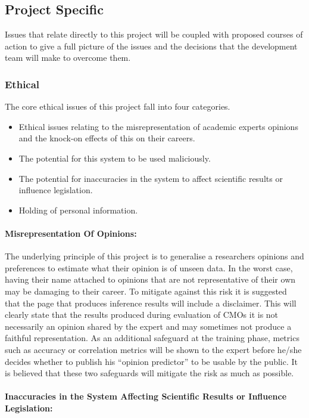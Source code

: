 \documentclass{ecmm427_assignment}
\begin{document}
\subsection{Project Specific}

Issues that relate directly to this project will
be coupled with proposed courses of action to give a full picture
of the issues and the decisions that the development team will make
to overcome them. 

\subsubsection{Ethical}

The core ethical issues of this project fall into four categories. 
\begin{itemize}
\item Ethical issues relating to the misrepresentation of academic experts
opinions and the knock-on effects of this on their careers.
\item The potential for this system to be used maliciously.
\item The potential for inaccuracies in the system to affect scientific
results or influence legislation. 
\item Holding of personal information.
\end{itemize}

\paragraph{Misrepresentation Of Opinions:}

 The underlying principle of this project is to generalise a researchers
opinions and preferences to estimate what their opinion is of unseen
data. In the worst case, having their name attached
to opinions that are not representative of their own may be damaging to their career. To mitigate against this risk it is suggested
that the page that produces inference results will include a disclaimer.
This will clearly state that the results produced during evaluation of CMOs 
it is not necessarily an opinion shared by the expert and may sometimes not produce a faithful representation. As an additional
safeguard at the training phase, metrics such as accuracy or correlation
metrics will be shown to the expert
before he/she decides whether to publish his ``opinion predictor''
to be usable by the public. It is believed that these two safeguards
will mitigate the risk as much as possible.

\paragraph{Inaccuracies in the System Affecting Scientific Results or Influence
Legislation:}
\end{document}
